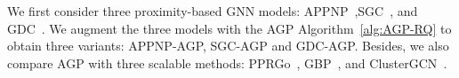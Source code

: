 We first consider three proximity-based GNN models: APPNP~\cite{Klicpera2018APPNP},SGC~\cite{wu2019SGC}, and GDC~\cite{klicpera2019GDC}. We augment the three models with the AGP Algorithm~\ref{alg:AGP-RQ} to obtain three variants: APPNP-AGP, SGC-AGP and GDC-AGP. Besides, we also compare AGP with three scalable methods: PPRGo~\cite{bojchevski2020scaling}, GBP~\cite{chen2020GBP}, and ClusterGCN~\cite{chiang2019clusterGCN}. 




